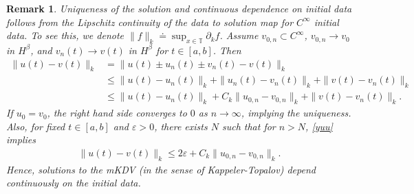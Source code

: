 \documentclass[12pt,reqno]{amsart}
\numberwithin{equation}{section}  %
\newcommand{\ci}{\mathbb{T}}
\newcommand{\p}{\partial}
\newcommand{\ee}{\varepsilon}
\newtheorem{remark}[theorem]{Remark}
\begin{document}
  \begin{framed}
  \begin{remark}
  Uniqueness of the solution and continuous dependence on initial data follows from the Lipschitz continuity of the data
  to solution map for $C^{\infty}$ initial data. To see this, we denote $\|f 
  \|_{k} \doteq \sup_{x \in \ci} \p_{k} f$. Assume $v_{0,n} \subset C^{\infty}$,
  $v_{0,n} \to v_{0}$ in $H^{\beta}$, and $v_{n}(t) \to v(t)$ in $H^{\beta}$ for
  $t \in [a,b]$. Then
  \begin{equation}
    \label{yuu}
  \begin{split}
    \|u(t) - v(t) \|_{k} 
    & = \|u(t) \pm u_{n}(t) \pm v_{n}(t) - v(t) \|_{k}
    \\
    & \le \| u(t) - u_{n}(t) \|_{k} + \| u_{n}(t) - v_{n}(t) \|_{k} + \|
    v(t) -
    v_{n}(t) \|_{k}
    \\
    & \le \| u(t) - u_{n}(t) \|_{k} + C_{k} \| u_{0,n} - v_{0,n} \|_{k} + \|
    v(t) -
    v_{n}(t) \|_{k}.
  \end{split}
  \end{equation}
  If $u_{0} = v_{0}$, the right hand side converges to $0$ as $n \to \infty$,
  implying the uniqueness.
  Also, for fixed $t \in [a,b]$ and $\ee > 0$, there exists $N$ such that for $n > N$,
  \eqref{yuu} implies
  \begin{equation*}
  \begin{split}
  \|u(t) - v(t) \|_{k} 
       \le 2 \ee +  C_{k} \| u_{0,n} - v_{0,n} \|_{k}.
     \end{split}
  \end{equation*}
  Hence, solutions to the mKDV (in the sense of Kappeler-Topalov) depend
  continuously on the initial data.
  \label{rem:uniqueness}
  \end{remark}
  \end{framed}
  

  
\end{document}
